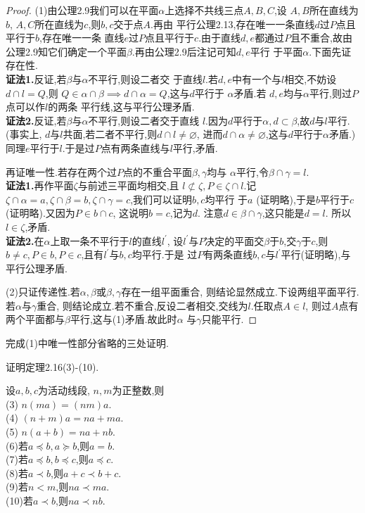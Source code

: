 \begin{proof}
    (1)由公理2.9我们可以在平面$\alpha$上选择不共线三点$A,B,C$,设
    $A,B$所在直线为$b$, $A,C$所在直线为$c$,则$b,c$交于点$A$.再由
    平行公理2.13,存在唯一一条直线$d$过$P$点且平行于$b$,存在唯一一条
    直线$e$过$P$点且平行于$c$.由于直线$d,e$都通过$P$且不重合,故由
    公理2.9知它们确定一个平面$\beta$.再由公理2.9后注记可知$d,e$平行
    于平面$\alpha$.下面先证存在性.\\
	\textbf{证法1.}反证,若$\beta$与$\alpha$不平行,则设二者交
    于直线$l$.若$d,e$中有一个与$l$相交,不妨设$d\cap l=Q$,则
    $Q\in\alpha\cap\beta\implies d\cap\alpha=Q$,这与$d$平行于
    $\alpha$矛盾.若 $d,e$均与$\alpha$平行,则过$P$点可以作$l$的两条
    平行线,这与平行公理矛盾.\\
	\textbf{证法2.}反证,若$\beta$与$\alpha$不平行,则设二者交于直线
    $l$.因为$d$平行于$\alpha,d\subset\beta$,故$d$与$l$平行.
    (事实上, $d$与$l$共面,若二者不平行,则$d\cap l\neq\varnothing$,
    进而$d\cap\alpha\neq\varnothing$,这与$d$平行于$\alpha$矛盾.)
    同理$e$平行于$l$.于是过$P$点有两条直线与$l$平行,矛盾.
	
	再证唯一性.若存在两个过$P$点的不重合平面$\beta,\gamma$均与
    $\alpha$平行,令$\beta\cap\gamma=l$.\\
	\textbf{证法1.}再作平面$\zeta$与前述三平面均相交,且
    $l\not\subset\zeta,P\in\zeta\cap l$.记$\zeta\cap\alpha=a,
    \zeta\cap\beta=b,\zeta\cap\gamma=c$,我们可以证明$b,c$均平行
    于$a$ (证明略),于是$b$平行于$c$ (证明略).又因为$P\in b\cap c$,
    这说明$b=c$,记为$d$. 注意$d\in\beta\cap\gamma$,这只能是$d=l$.
    所以$l\in\zeta$,矛盾.\\
	\textbf{证法2.}在$\alpha$上取一条不平行于$l$的直线$l^\prime$,
    设$l^\prime$与$P$决定的平面交$\beta$于$b$,交$\gamma$于$c$,则
    $b\neq c,P\in b,P\in c$,且有$l^\prime$与$b,c$均平行.于是
    过$P$有两条直线$b,c$与$l^\prime$平行(证明略),与平行公理矛盾.

    (2)只证传递性.若$\alpha,\beta$或$\beta,\gamma$存在一组平面重合,
    则结论显然成立.下设两组平面平行.若$\alpha$与$\gamma$重合,
    则结论成立.若不重合,反设二者相交,交线为$l$.任取点$A\in l$,
    则过$A$点有两个平面都与$\beta$平行,这与(1)矛盾.故此时$\alpha$
    与$\gamma$只能平行.
\end{proof}
\begin{practice}
    完成(1)中唯一性部分省略的三处证明.
\end{practice}
\begin{exercise}
    证明定理2.16(3)-(10).
\end{exercise}
\begin{216}
    设$a,b,c$为活动线段, $n,m$为正整数,则\\
    (3) $n(ma)=(nm)a$.\\
    (4) $(n+m)a=na+ma$.\\
    (5) $n(a+b)=na+nb$.\\
    (6)若$a\preccurlyeq b,a\succcurlyeq b$,则$a=b$.\\
    (7)若$a\preccurlyeq b,b\preccurlyeq c$,则$a\preccurlyeq c$.\\
    (8)若$a\prec b$,则$a+c\prec b+c$.\\
    (9)若$n<m$,则$na\prec ma$.\\
    (10)若$a\prec b$,则$na\prec nb$.
\end{216}
